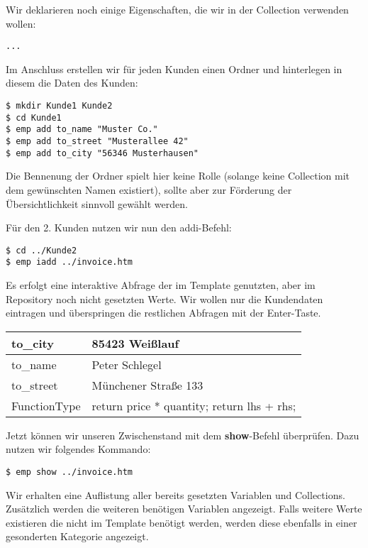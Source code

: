 Wir deklarieren noch einige Eigenschaften, die wir in der Collection verwenden wollen:

\begin{lstlisting}[style=Bash]
...
\end{lstlisting}

Im Anschluss erstellen wir für jeden Kunden einen Ordner und hinterlegen in diesem die Daten des Kunden:
\begin{lstlisting}[style=Bash]
$ mkdir Kunde1 Kunde2
$ cd Kunde1
$ emp add to_name "Muster Co."
$ emp add to_street "Musterallee 42"
$ emp add to_city "56346 Musterhausen"
\end{lstlisting}

Die Bennenung der Ordner spielt hier keine Rolle (solange keine Collection mit dem gewünschten Namen existiert), sollte aber zur Förderung der Übersichtlichkeit sinnvoll gewählt werden.

Für den 2. Kunden nutzen wir nun den addi-Befehl:
\begin{lstlisting}[style=Bash]
$ cd ../Kunde2
$ emp iadd ../invoice.htm
\end{lstlisting}

Es erfolgt eine interaktive Abfrage der im Template genutzten, aber im Repository noch nicht gesetzten Werte. Wir wollen nur die Kundendaten eintragen und überspringen die restlichen Abfragen mit der Enter-Taste.

\begin{tabular}{| l | l |}
	\hline
	to_city & 85423 Weißlauf \\
	\hline
	to_name & Peter Schlegel \\
	\hline
	to_street & Münchener Straße 133 \\
	\hline
	FunctionType & \grqq return price * quantity; return lhs + rhs; \grqq\\
	\hline
\end{tabular}

Jetzt können wir unseren Zwischenstand mit dem \textbf{show}-Befehl überprüfen. Dazu nutzen wir folgendes Kommando:
\begin{lstlisting}[style=Bash]
$ emp show ../invoice.htm
\end{lstlisting}

Wir erhalten eine Auflistung aller bereits gesetzten Variablen und Collections. Zusätzlich werden die weiteren benötigen Variablen angezeigt. Falls weitere Werte existieren die nicht im Template benötigt werden, werden diese ebenfalls in einer gesonderten Kategorie angezeigt.

